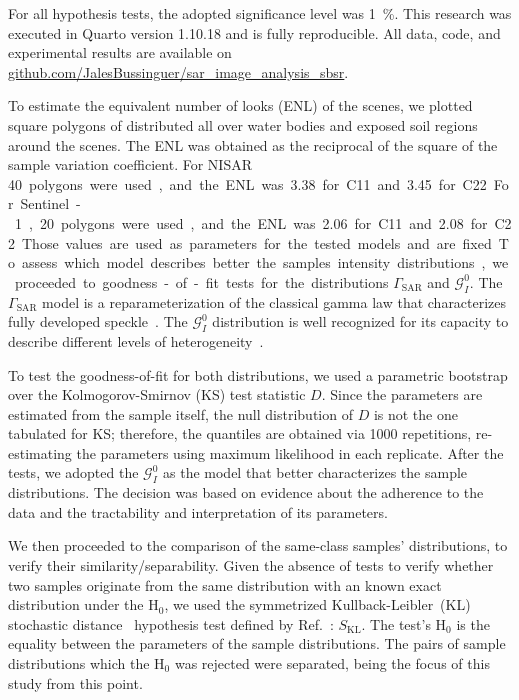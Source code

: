 For all hypothesis tests, the adopted significance level was 
\qty{1}{\percent}.
This research was executed in Quarto \cite{quarto} version 1.10.18 and is fully reproducible.
All data, code, and experimental results are available on \url{github.com/JalesBussinguer/sar_image_analysis_sbsr}.

To estimate the equivalent number of looks (ENL) of the scenes, we plotted square polygons of  distributed all over water bodies and exposed soil regions around the scenes.
The ENL was obtained as the reciprocal of the square of the sample variation coefficient.
For NISAR \qty{40} polygons were used, and the ENL was \qty{3.38} for C11 and \qty{3.45} for C22.
For Sentinel-1, \qty{20} polygons were used, and the ENL was \qty{2.06} for C11 and \qty{2.08} for C22.
Those values are used as parameters for the tested models and are fixed.

To assess which model describes better the samples intensity distributions, we proceeded to goodness-of-fit tests for the distributions $\Gamma_{\text{SAR}}$ and $\mathcal G^0_I$.
The $\Gamma_{\text{SAR}}$ model is a reparameterization of the classical gamma law that characterizes fully developed speckle~\cite[Eq.~(1)]{alpala2025}.
The $\mathcal G^0_I$ distribution is well recognized for its capacity to describe different levels of heterogeneity~\cite[Eq.~(5)]{alpala2025}.

To test the goodness-of-fit for both distributions, we used a parametric bootstrap over the Kolmogorov-Smirnov (KS) test statistic $D$.
Since the parameters are estimated from the sample itself, the null distribution of $D$ is not the one tabulated for KS; therefore, the quantiles are obtained via \qty{1000}{} repetitions, re-estimating the parameters using maximum likelihood in each replicate.
After the tests, we adopted the $\mathcal G^0_I$ as the model that better characterizes the sample distributions.
The decision was based on evidence about the adherence to the data and the tractability and interpretation of its parameters.

We then proceeded to the comparison of the same-class samples' distributions, to verify their similarity/separability.
Given the absence of tests to verify whether two samples originate from the same distribution with an known exact distribution under the H$_{0}$, we used the symmetrized Kullback-Leibler~(KL) stochastic distance~\cite[item~i.]{nascimento2010} hypothesis test defined by Ref.~\cite[Eq.~(9)]{nascimento2010}: $S_{\mathrm{KL}}$.
The test's H$_{0}$ is the equality between the parameters of the sample distributions.
The pairs of sample distributions which the H$_{0}$ was rejected were separated, being the focus of this study from this point.


